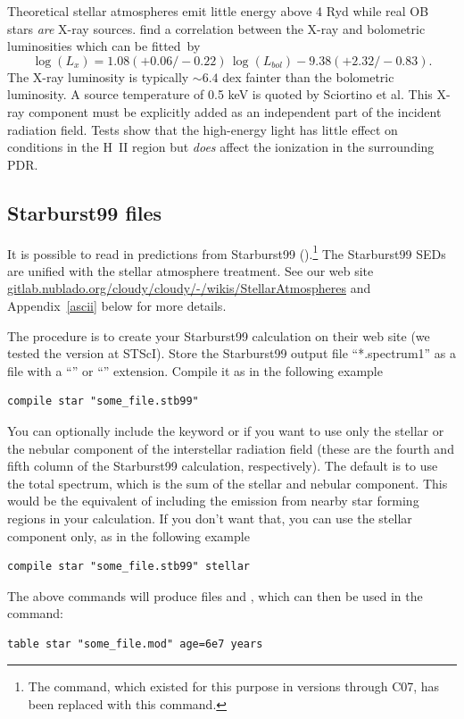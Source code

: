 Theoretical stellar atmospheres emit little energy above 4 Ryd while
real OB stars \emph{are} X-ray sources.
\citet{Sciortino1990} find a correlation
between the X-ray and bolometric luminosities which can be fitted~by
\begin{equation}
\log \left( {L_x } \right) = 1.08\left( { + 0.06/ - 0.22} \right)\,\log
\left( {L_{bol} } \right) - 9.38\left( { + 2.32/ - 0.83} \right) .%
\end{equation}
The X-ray luminosity is typically $\sim 6.4$ dex fainter
than the bolometric luminosity.
A source temperature of 0.5 keV is quoted by Sciortino et al.
This X-ray component must be explicitly added as an
independent part of the incident radiation field.
Tests show that the high-energy light has little effect on
conditions in the H~II region but \emph{does} affect the
ionization in the surrounding PDR.

\subsection{Starburst99 files}

It is possible to read in predictions from Starburst99 
(\citealp{Leitherer1999}).\footnote{The  command, 
which existed for this purpose in versions through C07, has been replaced
with this   command.}
The Starburst99 SEDs are unified with the stellar
atmosphere treatment.
See our web site
\href{https://gitlab.nublado.org/cloudy/cloudy/-/wikis/StellarAtmospheres}{gitlab.nublado.org/cloudy/cloudy/-/wikis/StellarAtmospheres} and
Appendix~\ref{ascii} below for more details.

The procedure is to create your Starburst99 calculation on their web site
(we tested the version at STScI).
Store the Starburst99 output file ``*.spectrum1'' as
a file with a ``''  or ``'' extension.
Compile it as in the following example
\begin{verbatim}
compile star "some_file.stb99"
\end{verbatim}
You can optionally include the keyword  or
 if you want to use only the stellar or the nebular
component of the interstellar radiation field (these are the fourth and fifth
column of the Starburst99 calculation, respectively). The default is to use
the total spectrum, which is the sum of the stellar and nebular component.
This would be the equivalent of including the emission from nearby star
forming regions in your calculation. If you don't want that, you can use the
stellar component only, as in the following example
\begin{verbatim}
compile star "some_file.stb99" stellar
\end{verbatim}
The above commands will produce files  and
, which can then
be used in the  command:
\begin{verbatim}
table star "some_file.mod" age=6e7 years
\end{verbatim}

